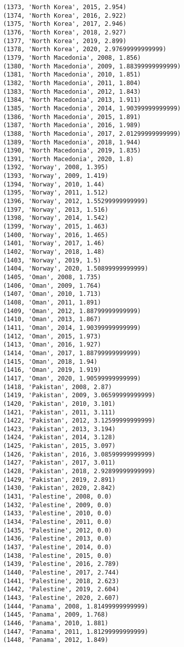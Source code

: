 \documentclass[11pt]{article}
\begin{document}
\begin{Verbatim}[commandchars=\\\{\}]
(1373, 'North Korea', 2015, 2.954)
(1374, 'North Korea', 2016, 2.922)
(1375, 'North Korea', 2017, 2.946)
(1376, 'North Korea', 2018, 2.927)
(1377, 'North Korea', 2019, 2.899)
(1378, 'North Korea', 2020, 2.97699999999999)
(1379, 'North Macedonia', 2008, 1.856)
(1380, 'North Macedonia', 2009, 1.88399999999999)
(1381, 'North Macedonia', 2010, 1.851)
(1382, 'North Macedonia', 2011, 1.804)
(1383, 'North Macedonia', 2012, 1.843)
(1384, 'North Macedonia', 2013, 1.911)
(1385, 'North Macedonia', 2014, 1.90399999999999)
(1386, 'North Macedonia', 2015, 1.891)
(1387, 'North Macedonia', 2016, 1.989)
(1388, 'North Macedonia', 2017, 2.01299999999999)
(1389, 'North Macedonia', 2018, 1.944)
(1390, 'North Macedonia', 2019, 1.835)
(1391, 'North Macedonia', 2020, 1.8)
(1392, 'Norway', 2008, 1.395)
(1393, 'Norway', 2009, 1.419)
(1394, 'Norway', 2010, 1.44)
(1395, 'Norway', 2011, 1.512)
(1396, 'Norway', 2012, 1.55299999999999)
(1397, 'Norway', 2013, 1.516)
(1398, 'Norway', 2014, 1.542)
(1399, 'Norway', 2015, 1.463)
(1400, 'Norway', 2016, 1.465)
(1401, 'Norway', 2017, 1.46)
(1402, 'Norway', 2018, 1.48)
(1403, 'Norway', 2019, 1.5)
(1404, 'Norway', 2020, 1.50899999999999)
(1405, 'Oman', 2008, 1.735)
(1406, 'Oman', 2009, 1.764)
(1407, 'Oman', 2010, 1.713)
(1408, 'Oman', 2011, 1.891)
(1409, 'Oman', 2012, 1.88799999999999)
(1410, 'Oman', 2013, 1.867)
(1411, 'Oman', 2014, 1.90399999999999)
(1412, 'Oman', 2015, 1.973)
(1413, 'Oman', 2016, 1.927)
(1414, 'Oman', 2017, 1.88799999999999)
(1415, 'Oman', 2018, 1.94)
(1416, 'Oman', 2019, 1.919)
(1417, 'Oman', 2020, 1.90599999999999)
(1418, 'Pakistan', 2008, 2.87)
(1419, 'Pakistan', 2009, 3.06599999999999)
(1420, 'Pakistan', 2010, 3.101)
(1421, 'Pakistan', 2011, 3.111)
(1422, 'Pakistan', 2012, 3.12599999999999)
(1423, 'Pakistan', 2013, 3.194)
(1424, 'Pakistan', 2014, 3.128)
(1425, 'Pakistan', 2015, 3.097)
(1426, 'Pakistan', 2016, 3.08599999999999)
(1427, 'Pakistan', 2017, 3.011)
(1428, 'Pakistan', 2018, 2.92899999999999)
(1429, 'Pakistan', 2019, 2.891)
(1430, 'Pakistan', 2020, 2.842)
(1431, 'Palestine', 2008, 0.0)
(1432, 'Palestine', 2009, 0.0)
(1433, 'Palestine', 2010, 0.0)
(1434, 'Palestine', 2011, 0.0)
(1435, 'Palestine', 2012, 0.0)
(1436, 'Palestine', 2013, 0.0)
(1437, 'Palestine', 2014, 0.0)
(1438, 'Palestine', 2015, 0.0)
(1439, 'Palestine', 2016, 2.789)
(1440, 'Palestine', 2017, 2.744)
(1441, 'Palestine', 2018, 2.623)
(1442, 'Palestine', 2019, 2.604)
(1443, 'Palestine', 2020, 2.607)
(1444, 'Panama', 2008, 1.81499999999999)
(1445, 'Panama', 2009, 1.768)
(1446, 'Panama', 2010, 1.881)
(1447, 'Panama', 2011, 1.81299999999999)
(1448, 'Panama', 2012, 1.849)

\end{Verbatim}
\end{document}
